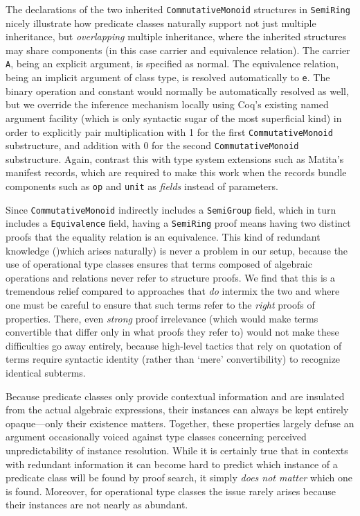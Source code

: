 \documentclass[a4paper,10pt,runningheads]{llncs}
\begin{document}
The declarations of the two inherited \lstinline|CommutativeMonoid| structures in \lstinline|SemiRing| nicely illustrate how predicate classes naturally support not just multiple inheritance, but \emph{overlapping} multiple inheritance, where the inherited structures may share components (in this case carrier and equivalence relation). The carrier \lstinline|A|, being an explicit argument, is specified as normal. The equivalence relation, being an implicit argument of class type, is resolved automatically to \lstinline|e|. The binary operation and constant would normally be automatically resolved as well, but we override the inference mechanism locally using Coq's existing named argument facility (which is only syntactic sugar of the most superficial kind) in order to explicitly pair multiplication with 1 for the first \lstinline|CommutativeMonoid| substructure, and addition with 0 for the second \lstinline|CommutativeMonoid| substructure. Again, contrast this with type system extensions such as Matita's manifest records, which are required to make this work when the records bundle components such as \lstinline|op| and \lstinline{unit} as \emph{fields} instead of parameters.

Since \lstinline|CommutativeMonoid| indirectly includes a \lstinline|SemiGroup| field, which in turn includes a \lstinline|Equivalence| field, having a \lstinline|SemiRing| proof means having two distinct proofs that the equality relation is an equivalence. This kind of redundant knowledge ()which arises naturally) is never a problem in our setup, because the use of operational type classes ensures that terms composed of algebraic operations and relations never refer to structure proofs. We find that this is a tremendous relief compared to approaches that \emph{do} intermix the two and where one must be careful to ensure that such terms refer to the \emph{right} proofs of properties. There, even \emph{strong} proof irrelevance (which would make terms convertible that differ only in what proofs they refer to) would not make these difficulties go away entirely, because high-level tactics that rely on quotation of terms require syntactic identity (rather than `mere' convertibility) to recognize identical subterms.

Because predicate classes only provide contextual information and are insulated from the actual algebraic expressions, their instances can always be kept entirely opaque---only their existence matters. Together, these properties largely defuse an argument occasionally voiced against type classes concerning perceived unpredictability of instance resolution. While it is certainly true that in contexts with redundant information it can become hard to predict which instance of a predicate class will be found by proof search, it simply \emph{does not matter} which one is found. Moreover, for operational type classes the issue rarely arises because their instances are not nearly as abundant.
\end{document}
